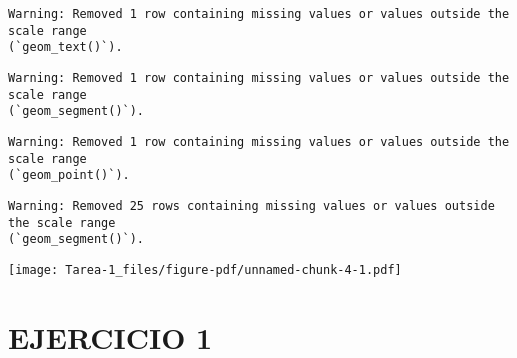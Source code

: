 \documentclass[
  letterpaper,
  DIV=11,
  numbers=noendperiod]{scrreprt}
\newenvironment{Shaded}{\begin{snugshade}}{\end{snugshade}}
\newcommand{\AttributeTok}[1]{\textcolor[rgb]{0.40,0.45,0.13}{#1}}
\newcommand{\DecValTok}[1]{\textcolor[rgb]{0.68,0.00,0.00}{#1}}
\newcommand{\DocumentationTok}[1]{\textcolor[rgb]{0.37,0.37,0.37}{\textit{#1}}}
\newcommand{\FunctionTok}[1]{\textcolor[rgb]{0.28,0.35,0.67}{#1}}
\newcommand{\NormalTok}[1]{\textcolor[rgb]{0.00,0.23,0.31}{#1}}
\newcommand{\OtherTok}[1]{\textcolor[rgb]{0.00,0.23,0.31}{#1}}
\newcommand{\SpecialCharTok}[1]{\textcolor[rgb]{0.37,0.37,0.37}{#1}}
\newcommand{\StringTok}[1]{\textcolor[rgb]{0.13,0.47,0.30}{#1}}
\begin{document}
\begin{Shaded}
\end{Shaded}

\begin{verbatim}
Warning: Removed 1 row containing missing values or values outside the scale range
(`geom_text()`).
\end{verbatim}

\begin{verbatim}
Warning: Removed 1 row containing missing values or values outside the scale range
(`geom_segment()`).
\end{verbatim}

\begin{verbatim}
Warning: Removed 1 row containing missing values or values outside the scale range
(`geom_point()`).
\end{verbatim}

\begin{verbatim}
Warning: Removed 25 rows containing missing values or values outside the scale range
(`geom_segment()`).
\end{verbatim}

\texttt{[image: Tarea-1\_files/figure-pdf/unnamed-chunk-4-1.pdf]}

\section{EJERCICIO 1}\label{ejercicio-1}
\end{document}
